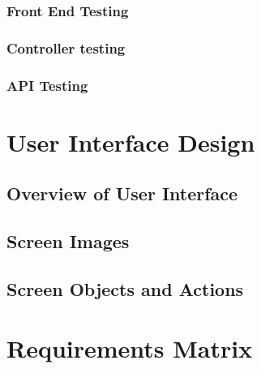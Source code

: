\documentclass[onecolumn, draftclsnofoot,10pt, compsoc]{article}
\begin{document}
		\subsubsection{Front End Testing}
	
		\subsubsection{Controller testing}
	
		\subsubsection{API Testing}
		
\section{User Interface Design}

	\subsection{Overview of User Interface}
	
	\subsection{Screen Images}
	
	\subsection{Screen Objects and Actions}

\section{Requirements Matrix}
\end{document}
